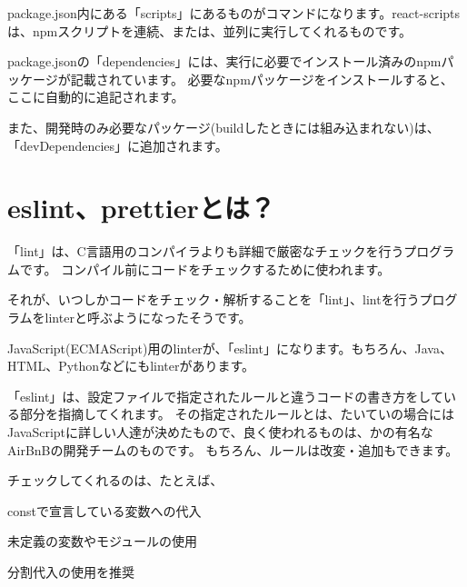 package.json内にある「scripts」にあるものがコマンドになります。react{-}scriptsは、npmスクリプトを連続、または、並列に実行してくれるものです。

\vspace*{\baselineskip}

package.jsonの「dependencies」には、実行に必要でインストール済みのnpmパッケージが記載されています。
必要なnpmパッケージをインストールすると、ここに自動的に追記されます。

\vspace*{\baselineskip}

また、開発時のみ必要なパッケージ(buildしたときには組み込まれない)は、「devDependencies」に追加されます。

\section{eslint、prettierとは？}
\keeplastskip{
  \label{sec:2-4}
  \label{sec-03lint}
  \par\nobreak
}

「lint」は、C言語用のコンパイラよりも詳細で厳密なチェックを行うプログラムです。
コンパイル前にコードをチェックするために使われます。

\vspace*{\baselineskip}

それが、いつしかコードをチェック・解析することを「lint」、lintを行うプログラムをlinterと呼ぶようになったそうです。

\vspace*{\baselineskip}

JavaScript(ECMAScript)用のlinterが、「eslint」になります。もちろん、Java、HTML、Pythonなどにもlinterがあります。

\vspace*{\baselineskip}

「eslint」は、設定ファイルで指定されたルールと違うコードの書き方をしている部分を指摘してくれます。
その指定されたルールとは、たいていの場合にはJavaScriptに詳しい人達が決めたもので、良く使われるものは、かの有名なAirBnBの開発チームのものです。
もちろん、ルールは改変・追加もできます。

\vspace*{\baselineskip}

チェックしてくれるのは、たとえば、\\[0pt]

\begin{starteritemize}
\item constで宣言している変数への代入
\item 未定義の変数やモジュールの使用
\item 分割代入の使用を推奨
\end{starteritemize}

